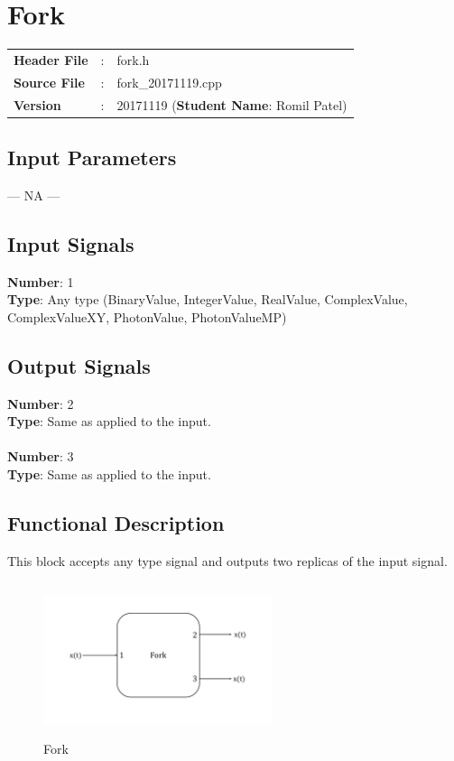 \clearpage

\section{Fork}

\begin{tcolorbox}	
\begin{tabular}{p{2.75cm} p{0.2cm} p{10.5cm}} 	
\textbf{Header File}   &:& fork.h \\
\textbf{Source File}   &:& fork\_20171119.cpp \\
\textbf{Version}       &:& 20171119 (\textbf{Student Name}: Romil Patel)
\end{tabular}
\end{tcolorbox}

\subsection*{Input Parameters}

--- NA ---

\subsection*{Input Signals}

\textbf{Number}: 1\\
\textbf{Type}: Any type (BinaryValue, IntegerValue, RealValue, ComplexValue, ComplexValueXY, PhotonValue, PhotonValueMP)

\subsection*{Output Signals}

\textbf{Number}: 2\\
\textbf{Type}: Same as applied to the input.\\
\\
\textbf{Number}: 3\\
\textbf{Type}: Same as applied to the input.

\subsection*{Functional Description}

This block accepts any type signal and outputs two replicas of the input signal.

\begin{figure}[h]
	\centering
	\includegraphics[width=0.6\textwidth, height=4.5cm]{./lib/fork/figures/fork.pdf}
	\caption{Fork}\label{}
\end{figure}